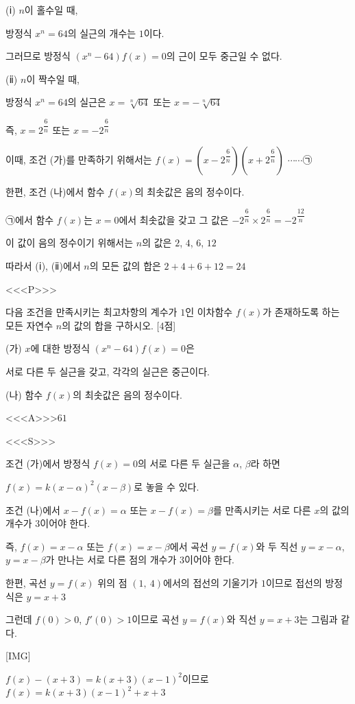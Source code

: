 \documentclass{oblivoir}
\begin{document}
(ⅰ) $n$이 홀수일 때,

방정식 $x^{n}=64$의 실근의 개수는 $1$이다.

그러므로 방정식 $(x^{n}-64)f(x)=0$의 근이 모두 중근일 수 없다.

(ⅱ) $n$이 짝수일 때,

방정식 $x^{n}=64$의 실근은 $x=\sqrt[n]{64}$ 또는 $x= -\sqrt[n]{64}$

즉, $x=2^{\dfrac{6}{n}}$ 또는 $x= -2^{\dfrac{6}{n}}$

이때, 조건 (가)를 만족하기 위해서는
$f(x)=\left(x-2^{\dfrac{6}{n}}\right)\left(x+2^{\dfrac{6}{n}}\right)$ $\cdots\cdots$㉠

한편, 조건 (나)에서 함수 $f(x)$의 최솟값은 음의 정수이다.

㉠에서 함수 $f(x)$는 $x=0$에서 최솟값을 갖고 그 값은 $-2^{\dfrac{6}{n}}\times 2^{\dfrac{6}{n}}= -2^{\dfrac{12}{n}}$

이 값이 음의 정수이기 위해서는 $n$의 값은 $2$, $4$, $6$, $12$  

따라서 (ⅰ), (ⅱ)에서 $n$의 모든 값의 합은 $2+4+6+12 = 24$

<<<P>>>

다음 조건을 만족시키는 최고차항의 계수가 $1$인 이차함수 $f(x)$가 존재하도록 하는 모든 자연수 $n$의 값의 합을 구하시오. [4점]

(가) $x$에 대한 방정식 $(x^{n}-64)f(x)=0$은 

서로 다른 두 실근을 갖고, 각각의 실근은 중근이다. 

(나) 함수 $f(x)$의 최솟값은 음의 정수이다.

<<<A>>>$61$

<<<S>>>

조건 (가)에서 방정식 $f(x)=0$의 서로 다른 두 실근을 $\alpha$, $\beta$라 하면

$f(x)=k(x-\alpha)^{2}(x-\beta)$로 놓을 수 있다.

조건 (나)에서 $x-f(x)=\alpha$ 또는 $x-f(x)=\beta$를 만족시키는 서로 다른 $x$의 값의 개수가 $3$이어야 한다.

즉, $f(x)=x-\alpha$ 또는 $f(x)=x-\beta$에서 곡선 $y=f(x)$와 두 직선 $y=x-\alpha$, $y=x-\beta$가 만나는 서로 다른 점의 개수가 $3$이어야 한다.

한편, 곡선 $y=f(x)$ 위의 점 $(1,\: 4)$에서의 접선의 기울기가 $1$이므로 접선의 방정식은 $y=x+3$

그런데 $f(0)>0$, $f'(0)>1$이므로 곡선 $y=f(x)$와 직선 $y=x+3$는 그림과 같다.

[IMG]

$f(x)-(x+3)=k(x+3)(x-1)^{2}$이므로 $f(x)=k(x+3)(x-1)^{2}+x+3$
\end{document}
